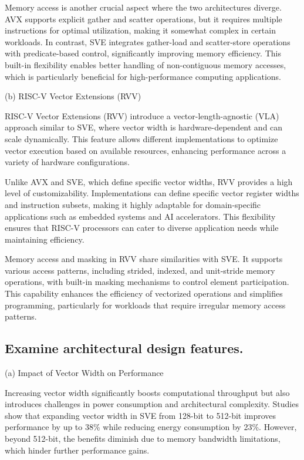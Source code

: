 \documentclass[conference]{IEEEtran}
\begin{document}
Memory access is another crucial aspect where the two architectures diverge. AVX supports explicit gather and scatter operations, but it requires multiple instructions for optimal utilization, making it somewhat complex in certain workloads\cite{b1}. In contrast, SVE integrates gather-load and scatter-store operations with predicate-based control, significantly improving memory efficiency\cite{b5}. This built-in flexibility enables better handling of non-contiguous memory accesses, which is particularly beneficial for high-performance computing applications.

(b) RISC-V Vector Extensions (RVV)

RISC-V Vector Extensions (RVV) introduce a vector-length-agnostic (VLA) approach similar to SVE, where vector width is hardware-dependent and can scale dynamically\cite{b6}. This feature allows different implementations to optimize vector execution based on available resources, enhancing performance across a variety of hardware configurations.

Unlike AVX and SVE, which define specific vector widths, RVV provides a high level of customizability. Implementations can define specific vector register widths and instruction subsets, making it highly adaptable for domain-specific applications such as embedded systems and AI accelerators\cite{b6}. This flexibility ensures that RISC-V processors can cater to diverse application needs while maintaining efficiency.

Memory access and masking in RVV share similarities with SVE. It supports various access patterns, including strided, indexed, and unit-stride memory operations, with built-in masking mechanisms to control element participation\cite{b6}. This capability enhances the efficiency of vectorized operations and simplifies programming, particularly for workloads that require irregular memory access patterns.
\subsection{Examine architectural design features.}
(a) Impact of Vector Width on Performance

Increasing vector width significantly boosts computational throughput but also introduces challenges in power consumption and architectural complexity. Studies show that expanding vector width in SVE from 128-bit to 512-bit improves performance by up to 38\% while reducing energy consumption by 23\%\cite{b4}. However, beyond 512-bit, the benefits diminish due to memory bandwidth limitations, which hinder further performance gains\cite{b5}.
\end{document}
